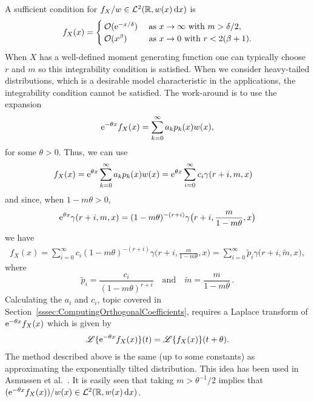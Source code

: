 A sufficient condition for $f_{X}/w\in\mathcal{L}^2(\mathbb{R}, w(x) \mathop{}\!\mathrm{d} x)$ is
\begin{equation} \label{eq:IntegrabilityCondition}
f_{X}(x)=
\begin{cases}
{\mathcal{O}}(\mathrm{e}^{- x/\delta})&\text{ as }x\rightarrow\infty\text{ with }m>\delta/2,\\
{\mathcal{O}}(x^{\beta})&\text{  as }x\rightarrow0\text{ with } r < 2( \beta + 1).
\end{cases}
\end{equation}
When $X$ has a well-defined moment generating function one can typically choose $r$ and $m$ so this integrability condition is satisfied. When we consider heavy-tailed distributions, which is a desirable model characteristic in the applications, the integrability condition cannot be satisfied. The work-around is to use the expansion
\[ \mathrm{e}^{-\theta x} f_{X}(x)
= \sum_{k=0}^\infty a_k p_k(x) w(x),  \]
for some $\theta > 0$. Thus, we can use
\begin{align*}
f_{X}(x)
&= \mathrm{e}^{\theta x} \sum_{k=0}^\infty a_k p_k(x) w(x)
=  \mathrm{e}^{\theta x} \sum_{i=0}^{\infty} c_i \gamma(r+i,m,x)
\end{align*}
and since, when $1-m \theta > 0$,
\[ \mathrm{e}^{\theta x} \gamma(r+i, m, x) = (1-m \theta)^{-(r+i)} \gamma\big(r+i, \frac{m}{1-m\theta}, x \big)  \]
we have
\begin{align*}
f_{X}(x)
= \sum_{i=0}^{\infty} c_i (1-m \theta)^{-(r+i)} \gamma\big(r+i, \frac{m}{1-m\theta}, x \big)
= \sum_{i=0}^{\infty} \widetilde{p}_i \gamma\big(r+i, \widetilde{m}, x \big),
\end{align*}
where
\[ \widetilde{p}_i = \frac{ c_i }{(1-m \theta)^{r+i}}
\quad\text{and}\quad
\widetilde{m} = \frac{m}{1-m\theta} \,.
\]
Calculating the $a_i$ and $c_i$, topic covered in Section~\ref{sssec:ComputingOrthogonalCoefficients}, requires a Laplace transform of $\mathrm{e}^{-\theta x} f_{X}(x)$ which is given by
\begin{align*}
\mathscr{L}\{ \mathrm{e}^{-\theta x} f_{X}(x) \}(t)
= \mathscr{L}\{ f_{X}(x) \}(t+\theta).
\end{align*}
The method described above is the same (up to some constants) as approximating the exponentially tilted distribution.
This idea has been used in Asmussen et al.\ \cite{asmussen2016orthonormal}.
It is easily seen that taking $m >\theta^{-1}/2$ implies that $(\mathrm{e}^{-\theta x} f_{X}(x))/w(x)\in\mathcal{L}^2(\mathbb{R}, w(x) \mathop{}\!\mathrm{d} x)$.

